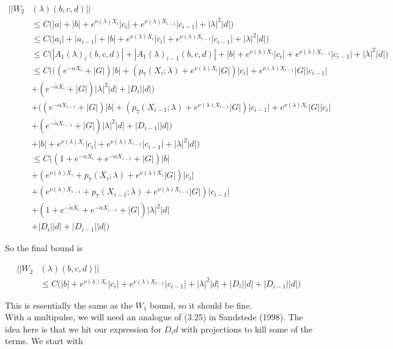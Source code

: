 \documentclass[12pt]{article}
\begin{document}
\begin{enumerate}
\begin{align*}
||W_2&(\lambda)(b,c,d)|| \\
&\leq C \Big(|a| + |b| + e^{\nu(\lambda)X_i}|c_i| + e^{\nu(\lambda)X_{i-1}}|c_{i-1}| + |\lambda|^2 |d| \Big) \\
&\leq C \Big(|a_i| + |a_{i-1}| + |b| + e^{\nu(\lambda)X_i}|c_i| + e^{\nu(\lambda)X_{i-1}}|c_{i-1}| + |\lambda|^2 |d| \Big) \\
&\leq C \Big(|A_1(\lambda)_i(b,c,d)| + |A_1(\lambda)_{i-1}(b,c,d)| + |b| + e^{\nu(\lambda)X_i}|c_i| + e^{\nu(\lambda)X_{i-1}}|c_{i-1}| + |\lambda|^2 |d| \Big) \\
&\leq C \Big( ((e^{-\alpha X_i} + |G|) |b| 
+ ( p_7(X_i; \lambda) + e^{\nu(\lambda)X_i} |G|) |c_i| + e^{\nu(\lambda)X_{i-1}} |G| |c_{i-1}| \\
&+ (e^{-\tilde{\alpha} X_i} + |G|) |\lambda|^2 |d| + |D_i||d| )\\
&+ ((e^{-\alpha X_{i-1}} + |G|) |b| 
+ ( p_7(X_{i-1}; \lambda) + e^{\nu(\lambda)X_{i-1}} |G|) |c_{i-1}| + e^{\nu(\lambda)X_i} |G| |c_i| \\
&+ (e^{-\tilde{\alpha} X_{i-1}} + |G|) |\lambda|^2 |d| + |D_{i-1}||d| )\\
&+ |b| + e^{\nu(\lambda)X_i}|c_i| + e^{\nu(\lambda)X_{i-1}}|c_{i-1}| + |\lambda|^2 |d| \Big) \\
&\leq C \Big( (1 + e^{-\alpha X_i} + e^{-\alpha X_{i-1}} + |G|)|b|\\
&+ ( e^{\nu(\lambda)X_i} + p_7(X_i; \lambda) + e^{\nu(\lambda)X_i} |G| ) |c_i| \\
&+ ( e^{\nu(\lambda)X_{i-1}} + p_7(X_{i-1}; \lambda) + e^{\nu(\lambda)X_{i-1}} |G|) |c_{i-1}| \\ 
&+ (1 + e^{-\tilde{\alpha} X_i} + e^{-\tilde{\alpha} X_{i-1}} + |G|)|\lambda|^2 |d| \\
&+ |D_i||d| + |D_{i-1}||d|
\Big)
\end{align*}

So the final bound is

\begin{align*}
||W_2&(\lambda)(b,c,d)|| \\
&\leq C \Big( |b| + e^{\nu(\lambda)X_i} |c_i| + e^{\nu(\lambda)X_{i-1}} |c_{i-1}| 
+ |\lambda|^2 |d| + |D_i||d| + |D_{i-1}||d|)
\end{align*}

This is essentially the same as the $W_1$ bound, so it should be fine.\\

With a multipulse, we will need an analogue of (3.25) in Sandstede (1998). The idea here is that we hit our expression for $D_i d$ with projections to kill some of the terms. We start with


\end{enumerate}
\end{document}
